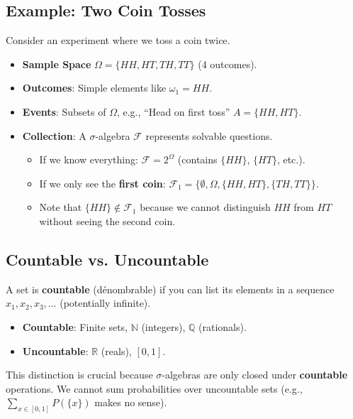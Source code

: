 \subsection{Example: Two Coin Tosses}
Consider an experiment where we toss a coin twice.
\begin{itemize}
    \item \textbf{Sample Space} $\Omega = \{HH, HT, TH, TT\}$ (4 outcomes).
    \item \textbf{Outcomes}: Simple elements like $\omega_1 = HH$.
    \item \textbf{Events}: Subsets of $\Omega$, e.g., ``Head on first toss'' $A = \{HH, HT\}$.
    \item \textbf{Collection}: A $\sigma$-algebra $\mathcal{F}$ represents solvable questions.
    \begin{itemize}
        \item If we know everything: $\mathcal{F} = 2^\Omega$ (contains $\{HH\}$, $\{HT\}$, etc.).
        \item If we only see the \textbf{first coin}: $\mathcal{F}_1 = \{ \emptyset, \Omega, \{HH, HT\}, \{TH, TT\} \}$.
        \item Note that $\{HH\} \notin \mathcal{F}_1$ because we cannot distinguish $HH$ from $HT$ without seeing the second coin.
    \end{itemize}
\end{itemize}


\subsection{Countable vs. Uncountable}
A set is \textbf{countable} (dénombrable) if you can list its elements in a sequence $x_1, x_2, x_3, \dots$ (potentially infinite).
\begin{itemize}
    \item \textbf{Countable}: Finite sets, $\mathbb{N}$ (integers), $\mathbb{Q}$ (rationals).
    \item \textbf{Uncountable}: $\mathbb{R}$ (reals), $[0, 1]$.
\end{itemize}
This distinction is crucial because $\sigma$-algebras are only closed under \textbf{countable} operations. We cannot sum probabilities over uncountable sets (e.g., $\sum_{x \in [0,1]} P(\{x\})$ makes no sense).

